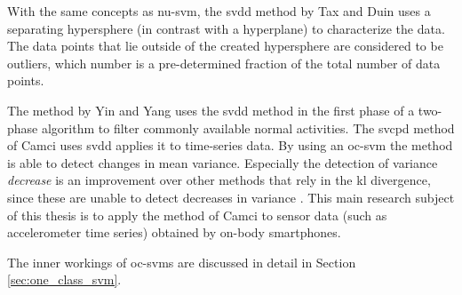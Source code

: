 With the same concepts as \gls{nu-svm}, the \gls{svdd} method by Tax and Duin \cite{tax1999support,tax2004support} uses a separating hypersphere (in contrast with a hyperplane) to characterize the data.
The data points that lie outside of the created hypersphere are considered to be outliers, which number is a pre-determined fraction of the total number of data points.

The method by Yin and Yang \cite{yin2008sensor} uses the \gls{svdd} method in the first phase of a two-phase algorithm to filter commonly available normal activities.
The \gls{svcpd} method of Camci \cite{camci2010change} uses \gls{svdd} applies it to time-series data.
By using an \gls{oc-svm} the method is able to detect changes in mean variance.
Especially the detection of variance \emph{decrease} is an improvement over other methods that rely in the \gls{kl} divergence, since these are unable to detect decreases in variance \cite{takeuchi2006unifying}.
This main research subject of this thesis is to apply the method of Camci \cite{camci2010change} to sensor data (such as accelerometer time series) obtained by on-body smartphones.

The inner workings of \glspl{oc-svm} are discussed in detail in Section \ref{sec:one_class_svm}.





